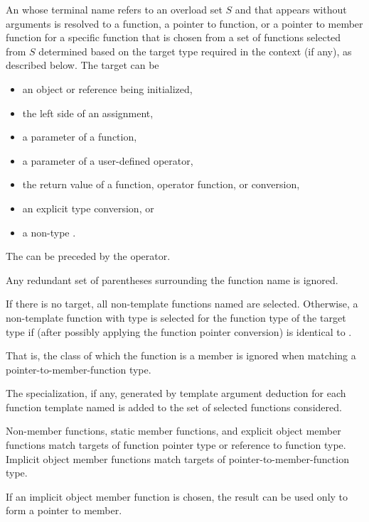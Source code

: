 \pnum
An 
whose terminal name refers to an overload set $S$ and
that appears without arguments
is resolved to
a function,
a pointer to function, or
a pointer to member function
for a specific function
that is chosen from a set of functions selected from $S$
determined based on the target type required in the context (if any),
as described below.
The target can be
\begin{itemize}
\item
an object or reference being initialized,
\item
the left side of an assignment,
\item
a parameter of a function,
\item
a parameter of a user-defined operator,
\item
the return value of a function, operator function, or conversion,
\item
an explicit type conversion, or
\item
a non-type
.
\end{itemize}
The  can be preceded by the \tcode{\&} operator.
\begin{note}
Any redundant set of parentheses surrounding the function name is
ignored.
\end{note}

\pnum
If there is no target, all non-template functions named are selected.
Otherwise, a non-template function with type 
is selected for the function type  of the target type
if 
(after possibly applying the function pointer conversion)
is identical to .
\begin{note}
That is, the class of which the function is a member is ignored when matching a
pointer-to-member-function type.
\end{note}

\pnum
The specialization, if any, generated by template argument
deduction
for each function template named
is added to the set of selected functions considered.

\pnum
Non-member functions,
static member functions, and
explicit object member functions
match targets of function pointer type or
reference to function type.
Implicit object member functions match targets of
pointer-to-member-function type.
\begin{note}
If an implicit object member function is chosen,
the result can be used only to form a pointer to member.
\end{note}

